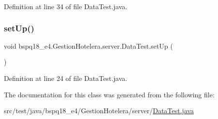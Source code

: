 Definition at line 34 of file Data\+Test.\+java.

\mbox{\label{classbspq18__e4_1_1_gestion_hotelera_1_1server_1_1_data_test_ae6efbcee0d351a598d969295d5d02d1f}} 
\subsubsection{\texorpdfstring{set\+Up()}{setUp()}}
{\footnotesize\ttfamily void bspq18\+\_\+e4.\+Gestion\+Hotelera.\+server.\+Data\+Test.\+set\+Up (\begin{DoxyParamCaption}{ }\end{DoxyParamCaption})}



Definition at line 24 of file Data\+Test.\+java.



The documentation for this class was generated from the following file\+:\begin{DoxyCompactItemize}
\item 
src/test/java/bspq18\+\_\+e4/\+Gestion\+Hotelera/server/\mbox{\hyperlink{_data_test_8java}{Data\+Test.\+java}}\end{DoxyCompactItemize}

